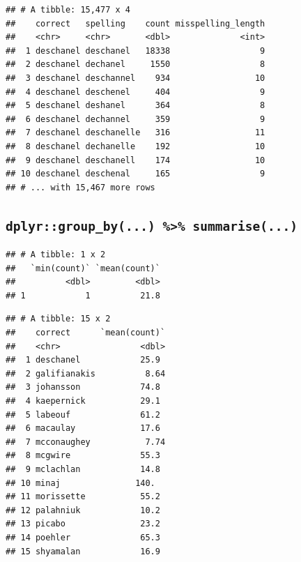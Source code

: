 \documentclass[]{book}
\newenvironment{Shaded}{\begin{snugshade}}{\end{snugshade}}
\newcommand{\KeywordTok}[1]{\textcolor[rgb]{0.13,0.29,0.53}{\textbf{#1}}}
\newcommand{\NormalTok}[1]{#1}
\newcommand{\OperatorTok}[1]{\textcolor[rgb]{0.81,0.36,0.00}{\textbf{#1}}}
\newcommand{\StringTok}[1]{\textcolor[rgb]{0.31,0.60,0.02}{#1}}
\begin{document}
\begin{verbatim}
## # A tibble: 15,477 x 4
##    correct   spelling    count misspelling_length
##    <chr>     <chr>       <dbl>              <int>
##  1 deschanel deschanel   18338                  9
##  2 deschanel dechanel     1550                  8
##  3 deschanel deschannel    934                 10
##  4 deschanel deschenel     404                  9
##  5 deschanel deshanel      364                  8
##  6 deschanel dechannel     359                  9
##  7 deschanel deschanelle   316                 11
##  8 deschanel dechanelle    192                 10
##  9 deschanel deschanell    174                 10
## 10 deschanel deschenal     165                  9
## # ... with 15,467 more rows
\end{verbatim}

\hypertarget{dplyrgroup_by...-summarise...}{%
\subsection{\texorpdfstring{\texttt{dplyr::group\_by(...)\ \%\textgreater{}\%\ summarise(...)}}{dplyr::group\_by(...) \%\textgreater\% summarise(...)}}\label{dplyrgroup_by...-summarise...}}

\begin{Shaded}
\end{Shaded}

\begin{verbatim}
## # A tibble: 1 x 2
##   `min(count)` `mean(count)`
##          <dbl>         <dbl>
## 1            1          21.8
\end{verbatim}

\begin{Shaded}
\end{Shaded}

\begin{verbatim}
## # A tibble: 15 x 2
##    correct      `mean(count)`
##    <chr>                <dbl>
##  1 deschanel            25.9 
##  2 galifianakis          8.64
##  3 johansson            74.8 
##  4 kaepernick           29.1 
##  5 labeouf              61.2 
##  6 macaulay             17.6 
##  7 mcconaughey           7.74
##  8 mcgwire              55.3 
##  9 mclachlan            14.8 
## 10 minaj               140.  
## 11 morissette           55.2 
## 12 palahniuk            10.2 
## 13 picabo               23.2 
## 14 poehler              65.3 
## 15 shyamalan            16.9
\end{verbatim}
\end{document}
